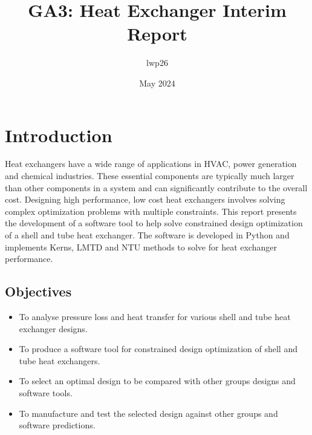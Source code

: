 \documentclass{article}
\begin{document}
\title{GA3: Heat Exchanger Interim Report}
\author{lwp26}
\date{May 2024}
\maketitle 

\section{Introduction}

Heat exchangers have a wide range of applications in HVAC, power generation and chemical industries.
These essential components are typically much larger than other components in a system and can significantly contribute to the overall cost.
Designing high performance, low cost heat exchangers involves solving complex optimization problems with multiple constraints.
This report presents the development of a software tool to help solve constrained design optimization of a shell and tube heat exchanger.
The software is developed in Python and implements Kerns, LMTD and NTU methods to solve for heat exchanger performance.

 
\subsection{Objectives}

\begin{itemize}
    \item To analyse pressure loss and heat transfer for various shell and tube heat exchanger designs.
    \item To produce a software tool for constrained design optimization of shell and tube heat exchangers.
    \item To select an optimal design to be compared with other groups designs and software tools.
    \item To manufacture and test the selected design against other groups and software predictions.
\end{itemize}
\end{document}
